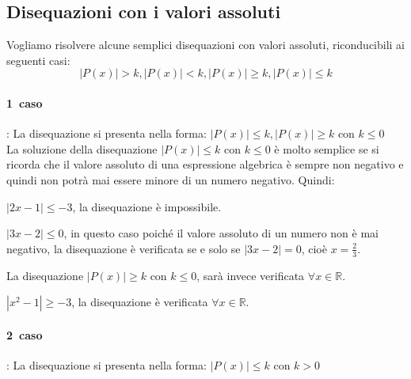\subsection{Disequazioni con i valori assoluti}

Vogliamo risolvere alcune semplici disequazioni con valori assoluti, 
riconducibili ai seguenti casi:
$$|P(x)|>k, |P(x)|<k, |P(x)|\geq k, |P(x)|\leq k$$


\paragraph{1\textdegree~caso}: La disequazione si presenta nella forma:  
$|P(x)|\leq k, |P(x)|\geq k$ con $k\leq 0$\\
La soluzione della disequazione $|P(x)|\leq k$ con $k\leq 0$ è molto semplice 
se 
si ricorda che il valore assoluto di una espressione algebrica è sempre non 
negativo e quindi non potrà mai essere minore di un numero negativo. Quindi:

\begin{esempio}  
$|2x-1|\leq -3$, la disequazione è impossibile.
\end{esempio}
\begin{esempio} $|3x-2|\leq 0$, in questo caso poiché il 
valore assoluto di un numero non è mai negativo, la disequazione è verificata 
se e solo se $|3x-2|=0$, cioè $x=\frac{2}{3}$.
\end{esempio}

La disequazione $|P(x)|\geq k$ con $k\leq 0$, sarà invece verificata $\forall x 
\in \mathbb{R}$.

\begin{esempio} $|x^2-1|\geq -3$, la disequazione è 
verificata $\forall x \in \mathbb{R}$.
\end{esempio}

\paragraph{2\textdegree~caso}: La disequazione si presenta nella forma:  
$|P(x)|\leq k$ con $k> 0$\\


